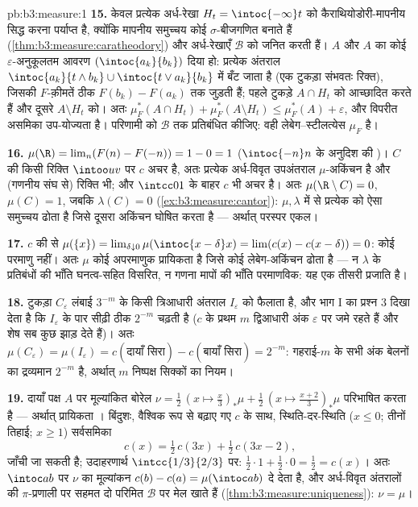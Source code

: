 \begin{solution}{pb:b3:measure:1}
\textbf{15.} केवल प्रत्येक अर्ध-रेखा $H_t =
\intoc{-\infty}t$ को कैराथियोडोरी-मापनीय
सिद्ध करना पर्याप्त है, क्योंकि मापनीय समुच्चय कोई $\sigma$-बीजगणित
बनाते हैं (\cref{thm:b3:measure:caratheodory}) और अर्ध-रेखाएँ $\mathcal B$ को जनित करती हैं। $A$ और
$A$ का कोई $\varepsilon$-अनुकूलतम आवरण $(\intoc{a_k}{b_k})$ दिया हो: प्रत्येक अंतराल
$\intoc{a_k}{t\wedge b_k} \cup \intoc{t \vee a_k}{b_k}$ में बँट जाता है (एक टुकड़ा संभवतः रिक्त), जिसकी $F$-क़ीमतें
ठीक $F(b_k) - F(a_k)$ तक जुड़ती हैं; पहले टुकड़े $A \cap H_t$ को आच्छादित करते हैं और
दूसरे $A \setminus H_t$ को। अतः $\mu_F^*(A\cap H_t) +
\mu_F^*(A\setminus H_t) \leq \mu_F^*(A) + \varepsilon$, और विपरीत असमिका उप-योज्यता है। परिणामी
 को $\mathcal B$ तक प्रतिबंधित कीजिए: वही लेबेग--स्टीलत्येस  $\mu_F$
है।

\textbf{16.} $\mu(\R) = \lim_n(F(n) - F(-n)) = 1 - 0 = 1$ ($\intoc{-n}n$ के अनुदिश  की )। $C$ की किसी
रिक्ति $\intoo uv$ पर $c$ अचर है, अतः प्रत्येक अर्ध-विवृत उपअंतराल
$\mu$-अकिंचन है और (गणनीय संघ से) रिक्ति भी; और $\intcc01$ के बाहर $c$
भी अचर है। अतः $\mu(\R\setminus C) = 0$, $\mu(C) = 1$, जबकि $\lambda(C) =
0$ (\cref{ex:b3:measure:cantor}): $\mu, \lambda$ में से प्रत्येक
को ऐसा समुच्चय ढोता है जिसे दूसरा अकिंचन घोषित करता है --- अर्थात्
परस्पर एकल।

\textbf{17.} $c$ की  से $\mu(\{x\}) = \lim_{\delta\downarrow0}
\mu(\intoc{x-\delta}x) = \lim(c(x) - c(x-\delta)) = 0$: कोई परमाणु नहीं। अतः $\mu$
कोई अपरमाणुक प्रायिकता  है जिसे कोई लेबेग-अकिंचन  ढोता है
--- न $\lambda$ के प्रतिबंधों की भाँति घनत्व-सहित विसरित, न गणना मापों
की भाँति परमाणविक: यह एक तीसरी प्रजाति है।

\textbf{18.} टुकड़ा $C_\varepsilon$ लंबाई $3^{-m}$ के किसी त्रिआधारी अंतराल $I_\varepsilon$
को फैलाता है, और भाग I का प्रश्न 3 दिखा देता है कि $I_\varepsilon$ के पार
सीढ़ी ठीक $2^{-m}$ चढ़ती है ($c$ के प्रथम $m$ द्विआधारी अंक $\varepsilon$
पर जमे रहते हैं और शेष सब कुछ झाड़ देते हैं)। अतः $\mu(C_\varepsilon) = \mu(I_\varepsilon) =
c(\text{दायाँ सिरा}) - c(\text{बायाँ सिरा}) = 2^{-m}$: गहराई-$m$
के सभी अंक बेलनों का द्रव्यमान $2^{-m}$ है, अर्थात् $m$ निष्पक्ष
सिक्कों का नियम।

\textbf{19.} दायाँ पक्ष $A$ पर मूल्यांकित बोरेल  $\nu = \frac12\,(x \mapsto \tfrac x3)_*\mu + \frac12\,(x
\mapsto \tfrac{x+2}3)_*\mu$ परिभाषित
करता है --- अर्थात् प्रायिकता । बिंदुशः, वैश्विक रूप से बढ़ाए गए
$c$ के साथ, स्थिति-दर-स्थिति ($x \leq 0$; तीनों तिहाई; $x \geq 1$) सर्वसमिका
\[
c(x) = \tfrac12\,c(3x) + \tfrac12\,c(3x - 2),
\]
जाँची जा सकती है; उदाहरणार्थ $\intcc{1/3}{2/3}$ पर: $\frac12\cdot1 + \frac12\cdot0 =
\frac12 = c(x)$। अतः $\intoc ab$ पर $\nu$
का मूल्यांकन $c(b) - c(a) = \mu(\intoc ab)$ दे देता है, और अर्ध-विवृत अंतरालों की $\pi$-प्रणाली
पर सहमत दो परिमित  $\mathcal B$ पर मेल खाते हैं (\cref{thm:b3:measure:uniqueness}): $\nu =
\mu$।


\end{solution}
